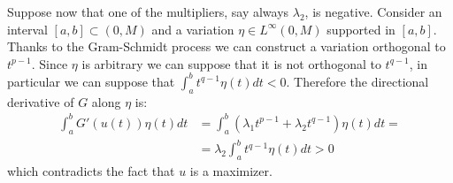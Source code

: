 \documentclass[corpo=11pt, stile=classica, tipotesi=custom,
greek, evenboxes, english]{toptesi}
\numberwithin{equation}{chapter}
\begin{document}
Suppose now that one of the multipliers, say always $\lambda_2$, is negative. Consider an interval $[a,b] \subset (0,M)$ and a variation $\eta \in L^{\infty}(0,M)$ supported in $[a,b]$. Thanks to the Gram-Schmidt process we can construct a variation orthogonal to $t^{p-1}$. Since $\eta$ is arbitrary we can suppose that it is not orthogonal to $t^{q-1}$, in particular we can suppose that $\int_{a}^{b}t^{q-1}\eta(t)dt <0$. Therefore the directional derivative of $G$ along $\eta$ is:
\begin{align*}
	\int_{a}^{b} G'(u(t))\eta(t)dt &= \int_{a}^{b} (\lambda_1 t^{p-1} + \lambda_2 t^{q-1})\eta(t)dt = \\
									   &= \lambda_2 \int_{a}^{b} t^{q-1} \eta(t)dt > 0
\end{align*}
which contradicts the fact that $u$ is a maximizer.
\end{document}
